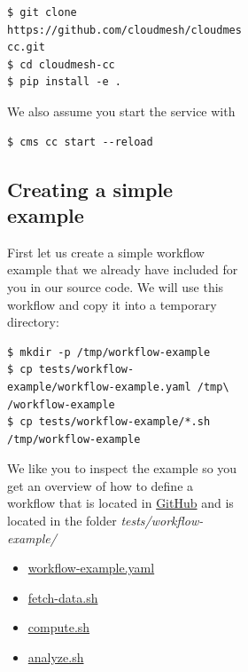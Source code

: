 \begin{figure}[htb]
\begin{figure}[htb]
\begin{figure}[htb]
\smallskip
\begin{verbatim}
$ git clone https://github.com/cloudmesh/cloudmesh-cc.git
$ cd cloudmesh-cc
$ pip install -e .
\end{verbatim}
\smallskip

We also assume you start the service with

\smallskip
\begin{verbatim}
$ cms cc start --reload
\end{verbatim}
\smallskip

\subsection{Creating a simple example}\label{creating-a-simple-example}

First let us create a simple workflow example that we already have
included for you in our source code. We will use this workflow and copy
it into a temporary directory:

\smallskip
\begin{verbatim}
$ mkdir -p /tmp/workflow-example
$ cp tests/workflow-example/workflow-example.yaml /tmp\
/workflow-example
$ cp tests/workflow-example/*.sh /tmp/workflow-example
\end{verbatim}
\smallskip


We like you to inspect the example so you get an overview of how to
define a workflow that is located in
\href{https://github.com/cloudmesh/cloudmesh-cc/tree/main/tests/workflow-example}{GitHub} and is located in the folder \emph{tests/workflow-example/}

\begin{itemize}
\item
  \href{https://github.com/cloudmesh/cloudmesh-cc/blob/main/tests/workflow-example/workflow-example.yaml}{workflow-example.yaml}
\item
  \href{https://github.com/cloudmesh/cloudmesh-cc/blob/main/tests/workflow-example/fetch-data.sh}{fetch-data.sh}
\item
  \href{https://github.com/cloudmesh/cloudmesh-cc/blob/main/tests/workflow-example/compute.sh}{compute.sh}
\item
  \href{https://github.com/cloudmesh/cloudmesh-cc/blob/main/tests/workflow-example/analyze.sh}{analyze.sh}
\end{itemize}


\end{figure}
\end{figure}
\end{figure}
